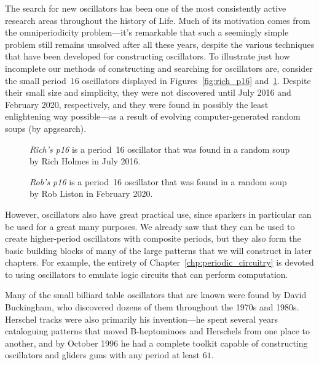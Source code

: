 The search for new oscillators has been one of the most consistently active research areas throughout the history of Life. Much of its motivation comes from the omniperiodicity problem---it's remarkable that such a seemingly simple problem still remains unsolved after all these years, despite the various techniques that have been developed for constructing oscillators. To illustrate just how incomplete our methods of constructing and searching for oscillators are, consider the small period~$16$ oscillators displayed in Figures~\ref{fig:rich_p16} and~\ref{fig:rob_p16}. Despite their small size and simplicity, they were not discovered until July 2016 and February 2020, respectively, and they were found in possibly the least enlightening way possible---as a result of evolving computer-generated random soups (by apgsearch).

\begin{figure}[!htb]
	\centering
	\begin{minipage}[b]{.48\textwidth}
		\centering
		\caption{\emph{Rich's p16} is a period~16 oscillator that was found in a random soup by Rich Holmes in July 2016.}\label{fig:rich_p16}
	\end{minipage} \hfill %
	\begin{minipage}[b]{.48\textwidth}
		\centering
		\caption{\emph{Rob's p16} is a period~16 oscillator that was found in a random soup by Rob Liston in February 2020.}\label{fig:rob_p16}
	\end{minipage}
\end{figure}

However, oscillators also have great practical use, since sparkers in particular can be used for a great many purposes. We already saw that they can be used to create higher-period oscillators with composite periods, but they also form the basic building blocks of many of the large patterns that we will construct in later chapters. For example, the entirety of Chapter~\ref{chp:periodic_circuitry} is devoted to using oscillators to emulate logic circuits that can perform computation.

Many of the small billiard table oscillators that are known were found by David Buckingham, who discovered dozens of them throughout the 1970s and 1980s. Herschel tracks were also primarily his invention---he spent several years cataloguing patterns that moved B-heptominoes and Herschels from one place to another, and by October 1996 he had a complete toolkit capable of constructing oscillators and gliders guns with any period at least $61$.


